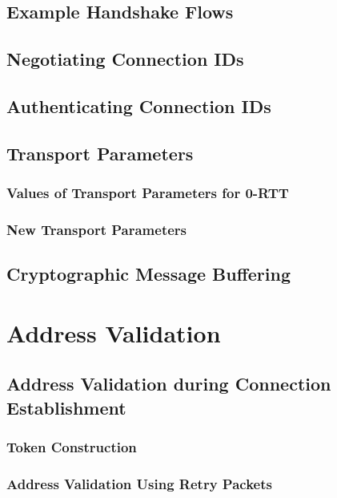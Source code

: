 \documentclass{article}
\begin{document}
\subsection{Example Handshake Flows}

\subsection{Negotiating Connection IDs}

\subsection{Authenticating Connection IDs}

\subsection{Transport Parameters}

\subsubsection{Values of Transport Parameters for 0-RTT}

\subsubsection{New Transport Parameters}

\subsection{Cryptographic Message Buffering}

\section{Address Validation}

\subsection{Address Validation during Connection Establishment}

\subsubsection{Token Construction}

\subsubsection{Address Validation Using Retry Packets}
\end{document}

